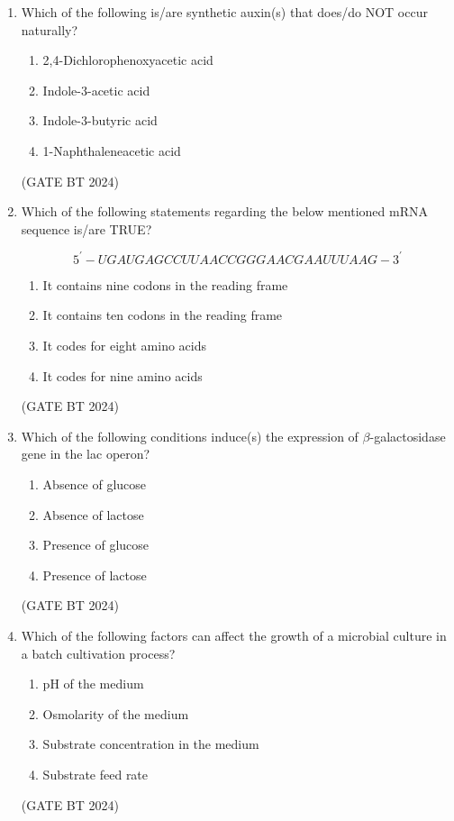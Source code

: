 \documentclass[journal,12pt,onecolumn]{IEEEtran}
\theoremstyle{remark}
\begin{document}
\begin{enumerate}
\item Which of the following is/are synthetic auxin(s) that does/do NOT occur naturally?
\begin{multicols}{2}
\begin{enumerate}
\item 2,4-Dichlorophenoxyacetic acid 
\item Indole-3-acetic acid 
\item Indole-3-butyric acid 
\item 1-Naphthaleneacetic acid
\end{enumerate}
\end{multicols}
\hfill (GATE BT 2024)

\item Which of the following statements regarding the below mentioned mRNA sequence is/are TRUE? 

\[
5^\prime-UGAUGAGCCUUAACCGGGAACGAAUUUAAG-3^\prime
\]

\begin{enumerate}
\item It contains nine codons in the reading frame
\item It contains ten codons in the reading frame 
\item It codes for eight amino acids 
\item It codes for nine amino acids
\end{enumerate}

\hfill (GATE BT 2024)

\item Which of the following conditions induce(s) the expression of $\beta$-galactosidase gene in the lac operon?
\begin{multicols}{2}
\begin{enumerate}
\item Absence of glucose 
\item Absence of lactose 
\item Presence of glucose 
\item Presence of lactose
\end{enumerate}
\end{multicols}
\hfill (GATE BT 2024)

\item Which of the following factors can affect the growth of a microbial culture in a batch cultivation process?
\begin{multicols}{2}
\begin{enumerate}
\item pH of the medium 
\item Osmolarity of the medium 
\item Substrate concentration in the medium 
\item Substrate feed rate
\end{enumerate}
\end{multicols}
\hfill (GATE BT 2024)


\end{enumerate}
\end{document}
